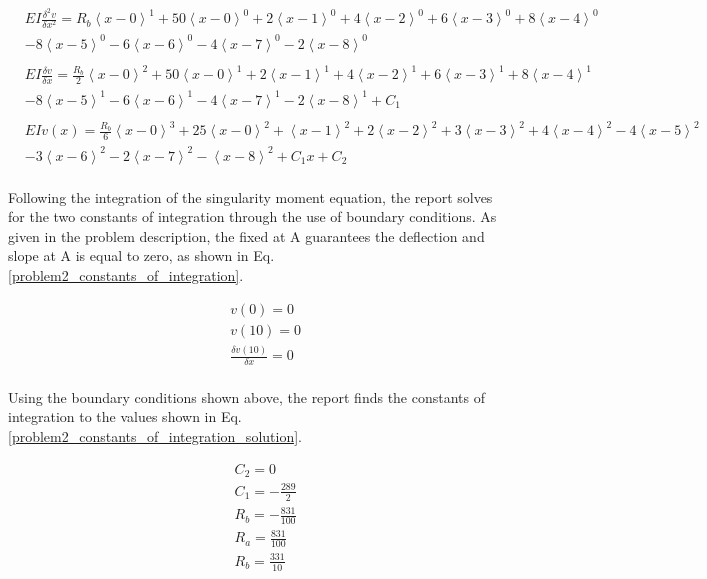 \documentclass[a4paper]{article}
\begin{document}
\begin{equation}
    \begin{split}
& EI \frac{\delta^2 v}{\delta x^2} = R_b\left<x-0\right>^1 + 50\left<x-0\right>^0 + 2\left<x-1\right>^0 + 4\left<x-2\right>^0 + 6\left<x-3\right>^0 + 8\left<x-4\right>^0    \\
& -  8\left<x-5\right>^0 - 6\left<x-6\right>^0 -  4\left<x-7\right>^0 - 2\left<x-8\right>^0 \\
& \\
& EI \frac{\delta v}{\delta x} = \frac{R_b}{2}\left<x-0\right>^2 + 50\left<x-0\right>^1 + 2\left<x-1\right>^1 + 4\left<x-2\right>^1 +  6\left<x-3\right>^1 + 8\left<x-4\right>^1  \\
& -  8\left<x-5\right>^1 - 6\left<x-6\right>^1 -  4\left<x-7\right>^1 - 2\left<x-8\right>^1 + C_1 \\
& \\
& EI v(x) = \frac{R_b}{6}\left<x-0\right>^3 + 25\left<x-0\right>^2 + \left<x-1\right>^2 + 2\left<x-2\right>^2 +  3\left<x-3\right>^2 + 4\left<x-4\right>^2   -  4\left<x-5\right>^2 \\
& - 3\left<x-6\right>^2  -  2\left<x-7\right>^2 - \left<x-8\right>^2 + C_1 x + C_2 \\
    \end{split}
\label{problem2_equations}
\end{equation}

Following the integration of the singularity moment equation, the report solves for the two constants of integration through the use of boundary conditions. As given in the problem description, the fixed at A guarantees the deflection and slope at A is equal to zero, as shown in Eq. \ref{problem2_constants_of_integration}.

\begin{equation}
\begin{split}
	& v(0) = 0 \\
	& v(10) = 0 \\
	& \frac{\delta v(10)}{\delta x} = 0 \\
\end{split}
\label{problem2_constants_of_integration}
\end{equation}

Using the boundary conditions shown above, the report finds the constants of integration to the values shown in Eq. \ref{problem2_constants_of_integration_solution}.

\begin{equation}
\begin{split}
	& C_2 = 0 \\
	& C_1 = -\frac{289}{2} \\
	& R_b = -\frac{831}{100} \\
	& R_a = \frac{831}{100} \\
	& R_b = \frac{331}{10} \\
\end{split}
\label{problem2_constants_of_integration_solution}
\end{equation}
\end{document}
